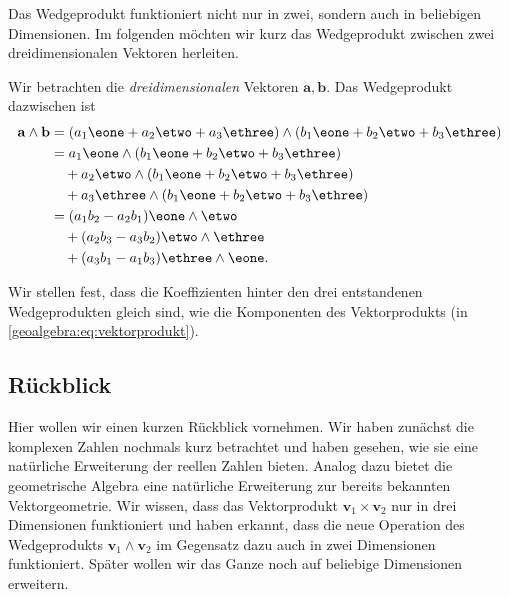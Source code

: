 Das Wedgeprodukt funktioniert nicht nur in zwei, sondern auch
in beliebigen Dimensionen. Im folgenden möchten wir kurz
das Wedgeprodukt zwischen zwei dreidimensionalen Vektoren
herleiten.

\begin{definition}
Wir betrachten die \emph{dreidimensionalen} Vektoren $\mathbf{a}, \mathbf{b}$.
Das Wedgeprodukt dazwischen ist
\begin{equation}
  \begin{aligned}
      \mathbf{a} \wedge \mathbf{b} &= (a_1 \eone + a_2 \etwo + a_3 \ethree) \wedge (b_1 \eone + b_2 \etwo + b_3 \ethree) \\
      &= a_1 \eone \wedge (b_1 \eone + b_2 \etwo + b_3 \ethree) \\
      &\quad+ a_2 \etwo \wedge (b_1 \eone + b_2 \etwo + b_3 \ethree) \\
      &\quad+ a_3 \ethree \wedge (b_1 \eone + b_2 \etwo + b_3 \ethree) \\
      &= (a_1 b_2 - a_2 b_1) \eone \wedge \etwo \\
      &\quad+ (a_2 b_3 - a_3 b_2) \etwo \wedge \ethree \\
      &\quad+ (a_3 b_1 - a_1 b_3) \ethree \wedge \eone.
  \end{aligned}
\end{equation}
\end{definition}
Wir stellen fest, dass die Koeffizienten hinter den drei entstandenen Wedgeprodukten
gleich sind, wie die Komponenten des Vektorprodukts (in \eqref{geoalgebra:eq:vektorprodukt}).

\subsection{Rückblick}
Hier wollen wir einen kurzen Rückblick vornehmen. Wir haben zunächst
die komplexen Zahlen nochmals kurz betrachtet und haben gesehen,
wie sie eine natürliche Erweiterung der reellen Zahlen bieten.
Analog dazu bietet die geometrische Algebra eine natürliche
Erweiterung zur bereits bekannten Vektorgeometrie. Wir wissen,
dass das Vektorprodukt $\mathbf{v}_1 \times \mathbf{v}_2$ nur
in drei Dimensionen funktioniert und haben erkannt, dass
die neue Operation des Wedgeprodukts $\mathbf{v}_1 \wedge \mathbf{v}_2$
im Gegensatz dazu auch in zwei Dimensionen funktioniert.
Später wollen wir das Ganze noch auf beliebige Dimensionen erweitern.
